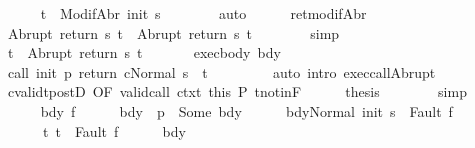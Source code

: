 \begin{isabellebody}
\ \ \ \ \isamarkupfalse%
\ {\isachardoublequoteopen}t{\isacharprime}\ {\isasymin}\ ModifAbr\ {\isacharparenleft}init\ s{\isacharparenright}{\isachardoublequoteclose}\isanewline
\ \ \ \ \ \ \isamarkupfalse%
\ auto\isanewline
\ \ \ \ \isamarkupfalse%
\ ret{\isacharunderscore}modifAbr\ \isamarkupfalse%
\ {\isachardoublequoteopen}Abrupt\ {\isacharparenleft}return\ s\ t{\isacharprime}{\isacharparenright}\ {\isacharequal}\ Abrupt\ {\isacharparenleft}return{\isacharprime}\ s\ t{\isacharprime}{\isacharparenright}{\isachardoublequoteclose}\isanewline
\ \ \ \ \ \ \isamarkupfalse%
\ simp\isanewline
\ \ \ \ \isamarkupfalse%
\ \isamarkupfalse%
\ {\isachardoublequoteopen}t\ {\isacharequal}\ Abrupt\ {\isacharparenleft}return{\isacharprime}\ s\ t{\isacharprime}{\isacharparenright}{\isachardoublequoteclose}\ \isacommand{{\isachardot}}\isamarkupfalse%
\isanewline
\ \ \ \ \isamarkupfalse%
\ exec{\isacharunderscore}body\ bdy\isanewline
\ \ \ \ \isamarkupfalse%
\ {\isachardoublequoteopen}{\isasymGamma}{\isasymturnstile}{\isasymlangle}call\ init\ p\ return{\isacharprime}\ c{\isacharcomma}Normal\ s{\isasymrangle}\ {\isasymRightarrow}\ t{\isachardoublequoteclose}\ \isanewline
\ \ \ \ \ \ \isamarkupfalse%
\ {\isacharparenleft}auto\ intro{\isacharcolon}\ exec{\isacharunderscore}callAbrupt{\isacharparenright}\isanewline
\ \ \ \ \isamarkupfalse%
\ cvalidt{\isacharunderscore}postD\ {\isacharbrackleft}OF\ valid{\isacharunderscore}call\ ctxt\ this{\isacharbrackright}\ P\ t{\isacharunderscore}notin{\isacharunderscore}F\isanewline
\ \ \ \ \isamarkupfalse%
\ {\isacharquery}thesis\isanewline
\ \ \ \ \ \ \isamarkupfalse%
\ simp\isanewline
\ \ \isamarkupfalse%
\isanewline
\ \ \ \ \isamarkupfalse%
\ bdy\ f\isanewline
\ \ \ \ \isamarkupfalse%
\ bdy{\isacharcolon}\ {\isachardoublequoteopen}{\isasymGamma}\ p\ {\isacharequal}\ Some\ bdy{\isachardoublequoteclose}\isanewline
\ \ \ \ \isamarkupfalse%
\ {\isachardoublequoteopen}{\isasymGamma}{\isasymturnstile}{\isasymlangle}bdy{\isacharcomma}Normal\ {\isacharparenleft}init\ s{\isacharparenright}{\isasymrangle}\ {\isasymRightarrow}\ Fault\ f{\isachardoublequoteclose}\ \ \isanewline
\ \ \ \ \ \ t{\isacharcolon}\ {\isachardoublequoteopen}t\ {\isacharequal}\ Fault\ f{\isachardoublequoteclose}\isanewline
\ \ \ \ \isamarkupfalse%
\ bdy\ \isamarkupfalse%

\end{isabellebody}
